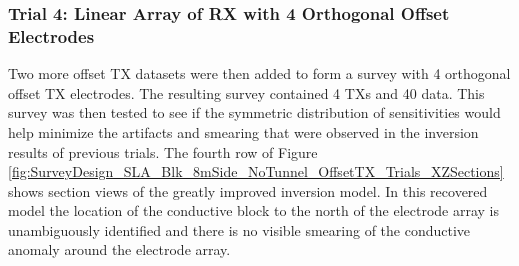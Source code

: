 \documentclass[preprint,authoryear,12pt]{elsarticle}
\begin{document}
\subsubsection{Trial 4: Linear Array of RX with 4 Orthogonal Offset Electrodes}
\label{sec:TheoreticalAnalysis_Trial4_4OrthogElecOffset}
Two more offset TX datasets were then added to form a survey with 4 orthogonal offset TX electrodes. The resulting survey contained 4 TXs and 40 data. This survey was then tested to see if the symmetric distribution of sensitivities would help minimize the artifacts and smearing that were observed in the inversion results of previous trials. The fourth row of Figure \ref{fig:SurveyDesign_SLA_Blk_8mSide_NoTunnel_OffsetTX_Trials_XZSections} shows section views of the greatly improved inversion model. In this recovered model the location of the conductive block to the north of the electrode array is unambiguously identified and there is no visible smearing of the conductive anomaly around the electrode array.
\end{document}
